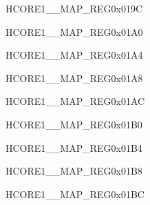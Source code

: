 \begin{register}{H}{CORE1\_\_MAP\_REG}{0x019C}\label{regdesc:CORE1USBOTG11INTMAPREG}
\end{register}\vspace{-3em}


\begin{register}{H}{CORE1\_\_MAP\_REG}{0x01A0}\label{regdesc:CORE1DMA2DINCH0INTMAPREG}
\end{register}\vspace{-3em}


\begin{register}{H}{CORE1\_\_MAP\_REG}{0x01A4}\label{regdesc:CORE1DMA2DINCH1INTMAPREG}
\end{register}\vspace{-3em}


\begin{register}{H}{CORE1\_\_MAP\_REG}{0x01A8}\label{regdesc:CORE1DMA2DOUTCH0INTMAPREG}
\end{register}\vspace{-3em}


\begin{register}{H}{CORE1\_\_MAP\_REG}{0x01AC}\label{regdesc:CORE1DMA2DOUTCH1INTMAPREG}
\end{register}\vspace{-3em}


\begin{register}{H}{CORE1\_\_MAP\_REG}{0x01B0}\label{regdesc:CORE1DMA2DOUTCH2INTMAPREG}
\end{register}\vspace{-3em}


\begin{register}{H}{CORE1\_\_MAP\_REG}{0x01B4}\label{regdesc:CORE1PSRAMMSPIINTMAPREG}
\end{register}\vspace{-3em}


\begin{register}{H}{CORE1\_\_MAP\_REG}{0x01B8}\label{regdesc:CORE1HPSYSREGINTMAPREG}
\end{register}\vspace{-3em}


\begin{register}{H}{CORE1\_\_MAP\_REG}{0x01BC}\label{regdesc:CORE1PCNTINTMAPREG}
\end{register}\vspace{-3em}


